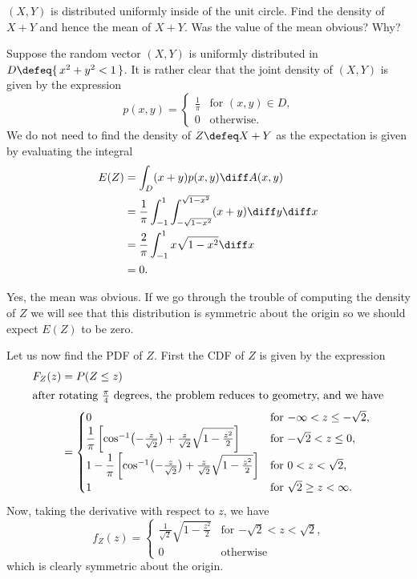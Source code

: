 \begin{problem}[Handout 18, \# 15]
  \((X,Y)\) is distributed uniformly inside of the unit circle. Find the
  density of \(X+Y\) and hence the mean of \(X+Y\). Was the value of the
  mean obvious? Why?
\end{problem}
\begin{solution}
  Suppose the random vector \((X,Y)\) is uniformly distributed in
  \(D\defeq \{\,x^2+y^2<1\,\}\). It is rather clear that the joint density
  of \((X,Y)\) is given by the expression
  \[
    p(x,y)=
    \begin{cases}
      \frac{1}{\pi}&\text{for \((x,y)\in D\),}\\
      0&\text{otherwise.}
    \end{cases}
  \]
  We do not need to find the density of \(Z\defeq X+Y\) as the expectation
  is given by evaluating the integral
  \begin{align*}
    E(Z)
    &=\int_D (x+y)p(x,y)\diff A(x,y)\\
    &=\frac{1}{\pi}\int_{-1}^1\int_{-\sqrt{1-x^2}}^{\sqrt{1-x^2}} (x+y)\diff
      y\diff x\\
    &=\frac{2}{\pi}\int_{-1}^1x\sqrt{1-x^2}\diff x\\
    &=0.
  \end{align*}

  Yes, the mean was obvious. If we go through the trouble of computing the
  density of \(Z\) we will see that this distribution is symmetric about
  the origin so we should expect \(E(Z)\) to be zero.

  Let us now find the PDF of \(Z\). First the CDF of \(Z\) is given by the
  expression
  \begin{align*}
    F_Z(z)
    &=P(Z\leq z)\\
    \intertext{after rotating \(\frac{\pi}{4}\) degrees, the problem
    reduces to geometry, and we have}
    &=
      \begin{cases}
        0&\text{for \(-\infty<z\leq-\sqrt{2}\),}\\
        \dfrac{1}{\pi}\left[\cos^{-1}\bigl(-\frac{z}{\sqrt{2}}\bigr)+\frac{z}{\sqrt{2}}\sqrt{1-\frac{z^2}{2}}\right]
        &\text{for \(-\sqrt{2}<z\leq 0\),}\\
        1-\dfrac{1}{\pi}\left[\cos^{-1}\bigl(-\frac{z}{\sqrt{2}}\bigr)+\frac{z}{\sqrt{2}}\sqrt{1-\frac{z^2}{2}}\right]
        &\text{for \(0<z<\sqrt{2}\),}\\
        1&\text{for \(\sqrt{2}\geq z<\infty\).}
      \end{cases}
  \end{align*}
  Now, taking the derivative with respect to \(z\), we have
  \[
    f_Z(z)=
    \begin{cases}
      \frac{1}{\sqrt{2}}\sqrt{1-\frac{z^2}{2}}&\text{for
        \(-\sqrt{2}<z<\sqrt{2}\),}\\
      0&\text{otherwise}
    \end{cases}
  \]
  which is clearly symmetric about the origin.
\end{solution}
\newpage

